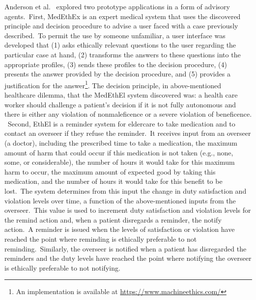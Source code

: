  Anderson et al.\ \cite{Anderson_Anderson_2007} explored two prototype applications in a form of advisory agents.\ First, MedEthEx is an expert medical system that uses the discovered principle and decision procedure to advise a user faced with a case previously described.\ To permit the use by someone unfamiliar, a user interface was developed that (1) asks ethically relevant questions to the user regarding the particular case at hand, (2) transforms the answers to these questions into the appropriate profiles, (3) sends these profiles to the decision procedure, (4) presents the answer provided by the decision procedure, and (5) provides a justification for the answer\footnote{An implementation is available at \url{https://www.machineethics.com/}}. The decision principle, in above-mentioned healthcare dilemma, that the MedEthEl system discovered was: a health care worker should challenge a patient’s decision if it is not fully autonomous and there is either any violation of nonmaleficence or a severe violation of beneficence.\\\
\indent Second, EthEl is a reminder system for eldercare to take medication and to contact an overseer if they refuse the reminder.\ It receives input from an overseer (a doctor), including the prescribed time to take a medication, the maximum amount of harm that could occur if this medication is not taken (e.g., none, some, or considerable), the number of hours it would take for this maximum harm to occur, the maximum amount of expected good by taking this medication, and the number of hours it would take for this benefit to be lost.\ The system determines from this input the change in duty satisfaction and violation levels over time, a function of the above-mentioned inputs from the overseer.\ This value is used to increment duty satisfaction and violation levels for the remind action and, when a patient disregards a reminder, the notify action.\ A reminder is issued when the levels of satisfaction or violation have reached the point where reminding is ethically preferable to not reminding.\ Similarly, the overseer is notified when a patient has disregarded the reminders and the duty levels have reached the point where notifying the overseer is ethically preferable to not notifying.

